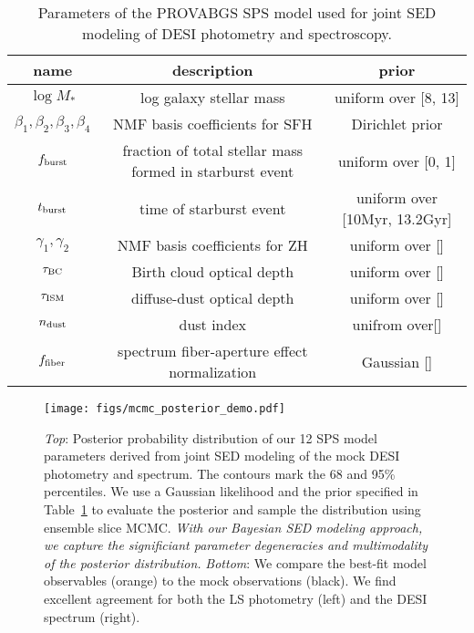 \begin{table} \label{tab:params}
\caption{Parameters of the PROVABGS SPS model used for joint SED modeling of
    DESI photometry and spectroscopy.} 
\begin{center}
    \begin{tabular}{ccc} \toprule
        name & description & prior \\[3pt]
        \hline 
        $\log M_*$                              & log galaxy stellar mass & uniform over [8, 13] \\
        $\beta_1, \beta_2, \beta_3, \beta_4$    & NMF basis coefficients for SFH & Dirichlet prior \\
        $f_{\rm burst}$ & fraction of total stellar mass formed in starburst event & uniform over [0, 1] \\
        $t_{\rm burst}$ & time of starburst event & uniform over [10Myr, 13.2Gyr] \\
        $\gamma_1, \gamma_2$ & NMF basis coefficients for ZH & uniform over [] \\
        $\tau_{\rm BC}$ & Birth cloud optical depth & uniform over [] \\
        $\tau_{\rm ISM}$ & diffuse-dust optical depth & uniform over [] \\
        $n_{\rm dust}$ & \cite{calzetti2001} dust index & unifrom over[]\\
        $f_{\rm fiber}$ & spectrum fiber-aperture effect normalization & Gaussian []\\
        \hline            
\end{tabular} 
\end{center}
\end{table}

\begin{figure}
\begin{center}
    \texttt{[image: figs/mcmc\_posterior\_demo.pdf]}
    \label{fig:posterior}
    \caption{
        \emph{Top}: 
        Posterior probability distribution of our 12 SPS model parameters
        derived from joint SED modeling of the mock DESI photometry and
        spectrum.
        The contours mark the 68 and 95\% percentiles.
        We use a Gaussian likelihood and the prior specified in
        Table~\ref{tab:params} to evaluate the posterior and sample the
        distribution using ensemble slice MCMC. 
        \emph{With our Bayesian SED modeling approach, we capture the significiant
        parameter degeneracies and multimodality of the posterior distribution.}
        \emph{Bottom}: 
        We compare the best-fit model observables (orange) to the mock
        observations (black).  
        We find excellent agreement for both the LS photometry (left) and the
        DESI spectrum (right). 
    }
\end{center}
\end{figure}


